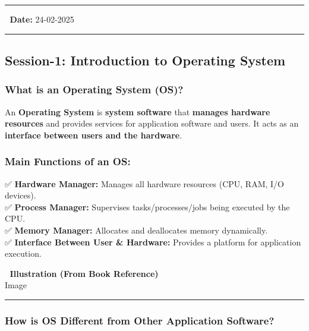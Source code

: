 \documentclass[
]{article}
\author{}
\date{}
\begin{document}
\begin{center}\rule{0.5\linewidth}{0.5pt}\end{center}

📅 \textbf{Date:} 24-02-2025

\begin{center}\rule{0.5\linewidth}{0.5pt}\end{center}

\subsection{\texorpdfstring{\textbf{Session-1: Introduction to Operating
System}}{Session-1: Introduction to Operating System}}\label{session-1-introduction-to-operating-system}

\subsubsection{\texorpdfstring{\textbf{What is an Operating System
(OS)?}}{What is an Operating System (OS)?}}\label{what-is-an-operating-system-os}

An \textbf{Operating System} is \textbf{system software} that
\textbf{manages hardware resources} and provides services for
application software and users. It acts as an \textbf{interface between
users and the hardware}.

\subsubsection{\texorpdfstring{\textbf{Main Functions of an
OS:}}{Main Functions of an OS:}}\label{main-functions-of-an-os}

✅ \textbf{Hardware Manager:} Manages all hardware resources (CPU, RAM,
I/O devices).\\
✅ \textbf{Process Manager:} Supervises tasks/processes/jobs being
executed by the CPU.\\
✅ \textbf{Memory Manager:} Allocates and deallocates memory
dynamically.\\
✅ \textbf{Interface Between User \& Hardware:} Provides a platform for
application execution.

📌 \textbf{Illustration (From Book Reference)}\\
{Image}

\begin{center}\rule{0.5\linewidth}{0.5pt}\end{center}

\subsubsection{\texorpdfstring{\textbf{How is OS Different from Other
Application
Software?}}{How is OS Different from Other Application Software?}}\label{how-is-os-different-from-other-application-software}
\end{document}
